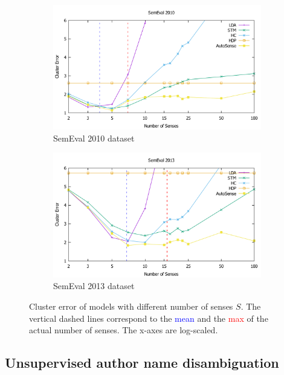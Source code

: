\documentclass[letterpaper]{article}
\begin{document}
\begin{figure}[!t]
	\centering
	\begin{subfigure}{0.45\textwidth}
	    \centering
		\includegraphics[width=\textwidth]{semeval2010_clusters}
		\caption{SemEval 2010 dataset}
	\end{subfigure}
	\begin{subfigure}{0.45\textwidth}
	    \centering
		\includegraphics[width=\textwidth]{semeval2013_clusters}
		\caption{SemEval 2013 dataset}
	\end{subfigure}
	\caption{Cluster error of models with different number of senses $S$. The vertical dashed lines correspond to the \textcolor{blue}{mean} and the \textcolor{red}{max} of the actual number of senses. The x-axes are log-scaled.}
	\label{fig:clusters}
\end{figure}

\subsection{Unsupervised author name disambiguation}
\end{document}
